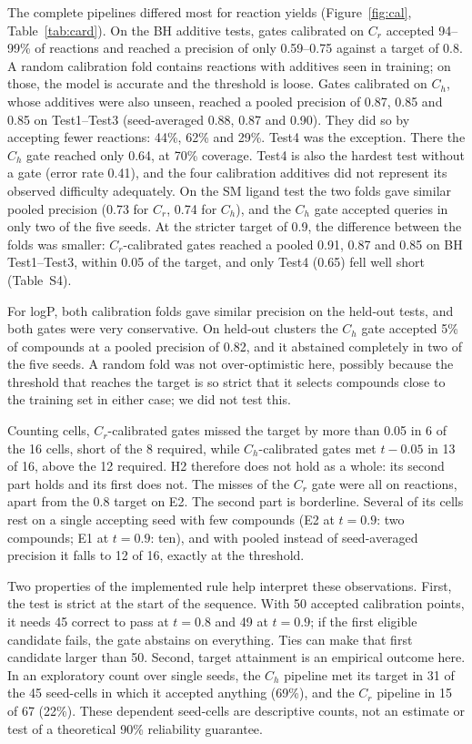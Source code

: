 \documentclass[11pt,letterpaper]{article}
\begin{document}
The complete pipelines differed most for reaction yields (Figure~\ref{fig:cal}, Table~\ref{tab:card}). On the BH additive tests, gates calibrated on $C_r$ accepted 94--99\% of reactions and reached a precision of only 0.59--0.75 against a target of 0.8. A random calibration fold contains reactions with additives seen in training; on those, the model is accurate and the threshold is loose. Gates calibrated on $C_h$, whose additives were also unseen, reached a pooled precision of 0.87, 0.85 and 0.85 on Test1--Test3 (seed-averaged 0.88, 0.87 and 0.90). They did so by accepting fewer reactions: 44\%, 62\% and 29\%. Test4 was the exception. There the $C_h$ gate reached only 0.64, at 70\% coverage. Test4 is also the hardest test without a gate (error rate 0.41), and the four calibration additives did not represent its observed difficulty adequately. On the SM ligand test the two folds gave similar pooled precision (0.73 for $C_r$, 0.74 for $C_h$), and the $C_h$ gate accepted queries in only two of the five seeds. At the stricter target of 0.9, the difference between the folds was smaller: $C_r$-calibrated gates reached a pooled 0.91, 0.87 and 0.85 on BH Test1--Test3, within 0.05 of the target, and only Test4 (0.65) fell well short (Table~S4).

For logP, both calibration folds gave similar precision on the held-out tests, and both gates were very conservative. On held-out clusters the $C_h$ gate accepted 5\% of compounds at a pooled precision of 0.82, and it abstained completely in two of the five seeds. A random fold was not over-optimistic here, possibly because the threshold that reaches the target is so strict that it selects compounds close to the training set in either case; we did not test this.

Counting cells, $C_r$-calibrated gates missed the target by more than 0.05 in 6 of the 16 cells, short of the 8 required, while $C_h$-calibrated gates met $t-0.05$ in 13 of 16, above the 12 required. H2 therefore does not hold as a whole: its second part holds and its first does not. The misses of the $C_r$ gate were all on reactions, apart from the 0.8 target on E2. The second part is borderline. Several of its cells rest on a single accepting seed with few compounds (E2 at $t = 0.9$: two compounds; E1 at $t = 0.9$: ten), and with pooled instead of seed-averaged precision it falls to 12 of 16, exactly at the threshold.

Two properties of the implemented rule help interpret these observations. First, the test is strict at the start of the sequence. With 50 accepted calibration points, it needs 45 correct to pass at $t = 0.8$ and 49 at $t = 0.9$; if the first eligible candidate fails, the gate abstains on everything. Ties can make that first candidate larger than 50. Second, target attainment is an empirical outcome here. In an exploratory count over single seeds, the $C_h$ pipeline met its target in 31 of the 45 seed-cells in which it accepted anything (69\%), and the $C_r$ pipeline in 15 of 67 (22\%). These dependent seed-cells are descriptive counts, not an estimate or test of a theoretical 90\% reliability guarantee.
\end{document}
